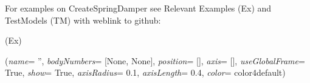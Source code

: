 %
\noindent For examples on CreateSpringDamper see Relevant Examples (Ex) and TestModels (TM) with weblink to github:
\bi
 \item \footnotesize {} (Ex)
\ei

%
\begin{flushleft}
\label{sec:mainsystemextensions:CreateRevoluteJoint}
({\it name}= '', {\it bodyNumbers}= [None, None], {\it position}= [], {\it axis}= [], {\it useGlobalFrame}= True, {\it show}= True, {\it axisRadius}= 0.1, {\it axisLength}= 0.4, {\it color}= color4default)
\end{flushleft}
\setlength{\itemindent}{0.7cm}
